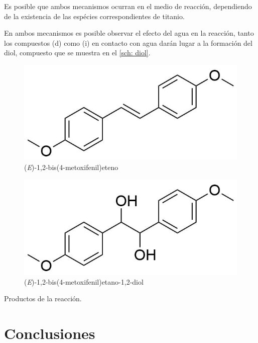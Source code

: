 \documentclass[fleqn,10pt]{SelfArx}
\begin{document}
Es posible que ambos mecanismos ocurran en el medio de reacci\'on, dependiendo de la existencia de las esp\'ecies correspondientes de titanio.

En ambos mecanismos es posible observar el efecto del agua en la reacci\'on, tanto los compuestos (d) como (i) en contacto con agua dar\'an lugar a la formaci\'on del diol, compuesto que se muestra en el \autoref{sch: diol}.

\begin{scheme}[h]
	\centering
	\scriptsize
	\begin{subfigure}[t]{0.49\linewidth}
		\centering
		\includegraphics[width=0.9\linewidth]{structures/product.png}
		\caption{(\textit{E})-1,2-bis(4-metoxifenil)eteno}
		\label{sch: producto}
	\end{subfigure}
	\begin{subfigure}[t]{0.49\linewidth}
		\centering
		\includegraphics[width=0.9\linewidth]{structures/product2.png}
		\caption{(\textit{E})-1,2-bis(4-metoxifenil)etano-1,2-diol}
		\label{sch: diol}
	\end{subfigure}
	\caption{Productos de la reacci\'on.}
\end{scheme}

\section{Conclusiones}
\end{document}

